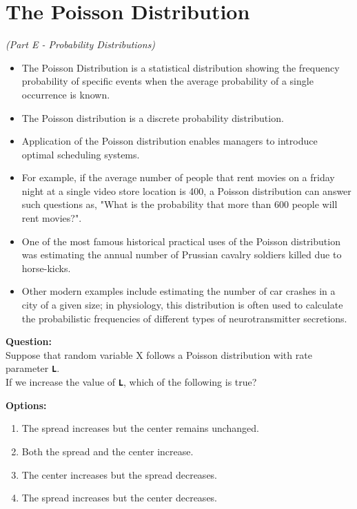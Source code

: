 \documentclass[]{article}
\begin{document}
\newpage
\large
\section*{The Poisson Distribution}
\textit{(Part E - Probability Distributions)}
\begin{itemize}
\item The Poisson Distribution is a statistical distribution showing the frequency probability of specific events when the average probability of a single occurrence is known. 

\item The Poisson distribution is a discrete probability distribution.

\item Application of the Poisson distribution enables managers to introduce optimal scheduling systems. 

\item For example, if the average number of people that rent movies on a friday night at a single video store location is 400,  a Poisson distribution can answer such questions as, "What is the probability that more than 600 people will rent movies?".



\item One of the most famous historical practical uses of the Poisson distribution was estimating the annual number of Prussian cavalry soldiers killed due to horse-kicks. 

\item Other modern examples include estimating the number of car crashes in a city of a given size; 
in physiology, this distribution is often used to calculate the probabilistic frequencies of different types of neurotransmitter secretions. 
\end{itemize}

\noindent\textbf{Question:}\\
Suppose that random variable X follows a Poisson distribution with rate parameter \texttt{\textbf{L}}. \\
If we increase the value of \texttt{\textbf{L}}, which of the following is true?


\bigskip
\noindent\textbf{Options:}
\begin{enumerate}
	\item The spread increases but the center remains unchanged.
	\item Both the spread and the center increase.
	\item The center increases but the spread decreases.
	\item The spread increases but the center decreases.
\end{enumerate}
\end{document}
